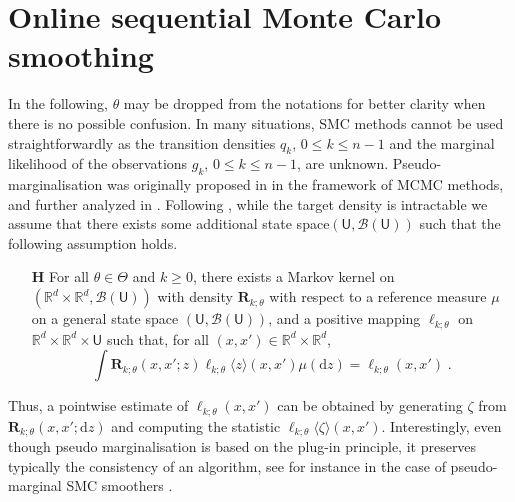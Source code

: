 \documentclass{article}
\def\Xset{\mathbb{R}^d}
\newcommand{\md}[1]{g_{#1}}
\newcommand{\parvec}{\theta}
\newcommand{\parspace}{\Theta}
\newcommand{\hd}[1]{q_{#1}}
\newcommand{\rmd}{\ensuremath{\mathrm{d}}}
\newcommand{\eqsp}{\;}
\newcounter{hypH}
\newenvironment{hypH}{\refstepcounter{hypH}\begin{itemize}
\item[{\bf H\arabic{hypH}}]}{\end{itemize}}
\newcommand{\marginalset}{\mathsf{U}}
\newcommand{\kernelmarg}{\mathbf{R}}
\newcommand{\qg}[1]{\ell_{#1}}
\newcommand{\hatqg}[1]{\mathsf{\ell}_{#1}}
\begin{document}
\section{Online sequential Monte Carlo smoothing}
\label{sec:bayesian:smoothing}
In the following, $\parvec$ may be  dropped from the notations for better clarity when there is no possible confusion. In many situations, SMC methods cannot be used straightforwardly as the transition densities $\hd{k}$, $0\leqslant k \leqslant n-1$ and the marginal likelihood of the observations $\md{k}$, $0\leqslant k \leqslant n-1$, are unknown. Pseudo-marginalisation was originally proposed in \cite{beaumont:2003} in the framework of MCMC methods, and further analyzed in \cite{andrieu:robert:2009}.  Following \cite{fearnhead2008particle, olsson2011particle, gloaguen2018online}, while the target density is intractable we assume that there exists some additional state space$(\marginalset,\mathcal{B}(\marginalset))$ such that the following assumption holds.
\begin{hypH} 
\label{assum:unbiased}
For all $\parvec \in\parspace$ and $k\geqslant 0$, there exists a Markov kernel on $(\Xset\times\Xset,\mathcal{B}(\marginalset))$ with density $\kernelmarg_{k;\parvec}$ with respect to a reference measure $\mu$ on a general state space $(\marginalset,\mathcal{B}(\marginalset))$,  and a positive mapping $\hatqg{k;\parvec}$ on $\Xset\times\Xset\times\marginalset$ such that, for all $(x,x')\in\Xset \times \Xset$,
\begin{equation*}
\int \kernelmarg_{k;\parvec}(x,x';z)\hatqg{k;\parvec}\langle z\rangle(x,x')\mu(\rmd z) =  \qg{k;\parvec}(x,x')\eqsp.
\end{equation*}
\end{hypH}
Thus, a pointwise estimate of $\qg{k;\parvec}(x,x')$ can be obtained by generating $\zeta$ from $\kernelmarg_{k;\parvec}(x,x';\rmd z)$ and computing the statistic $\hatqg{k;\parvec}\langle \zeta\rangle(x,x')$. Interestingly, even though pseudo marginalisation is based on the plug-in principle, it preserves typically the consistency of an algorithm, see for instance in the case of pseudo-marginal SMC smoothers \cite{gloaguen2021pseudo}.

\end{document}
